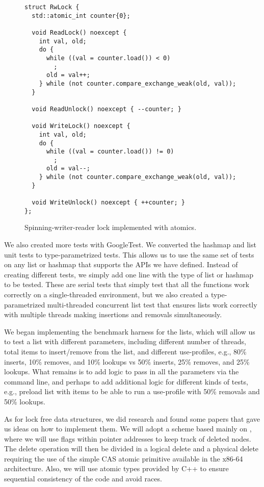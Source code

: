 \documentclass[11pt]{article}
\begin{document}
\begin{figure}
\begin{center}
\begin{lstlisting}
struct RwLock {
  std::atomic_int counter{0};

  void ReadLock() noexcept {
    int val, old;
    do {
      while ((val = counter.load()) < 0)
        ;
      old = val++;
    } while (not counter.compare_exchange_weak(old, val));
  }

  void ReadUnlock() noexcept { --counter; }

  void WriteLock() noexcept {
    int val, old;
    do {
      while ((val = counter.load()) != 0)
        ;
      old = val--;
    } while (not counter.compare_exchange_weak(old, val));
  }

  void WriteUnlock() noexcept { ++counter; }
};
\end{lstlisting}
\caption{Spinning-writer-reader lock implemented with atomics.}
\label{fig:rwlock}
\end{center}
\end{figure}

We also created more tests with GoogleTest. We converted the hashmap and list
unit tests to type-parametrized tests. This allows us to use the same set of
tests on any list or hashmap that supports the APIs we have defined. Instead of
creating different tests, we simply add one line with the type of list or
hashmap to be tested. These are serial tests that simply test that all the
functions work correctly on a single-threaded environment, but we also created a
type-parametrized multi-threaded concurrent list test that ensures lists work
correctly with multiple threads making insertions and removals simultaneously.

We began implementing the benchmark harness for the lists, which will allow us
to test a list with different parameters, including different number of threads,
total items to insert/remove from the list, and different use-profiles, e.g.,
80\% inserts, 10\% removes, and 10\% lookups vs 50\% inserts, 25\% removes, and
25\% lookups. What remains is to add logic to pass in all the parameters via the
command line, and perhaps to add additional logic for different kinds of tests,
e.g., preload list with items to be able to run a use-profile with 50\% removals
and 50\% lookups.

As for lock free data structures, we did research and found some papers that gave
us ideas on how to implement them. We will adopt a scheme based mainly on
\cite{Harris}, where we will use flags within pointer addresses to keep track of
deleted nodes. The delete operation will then be divided in a logical delete and
a physical delete requiring the use of the simple CAS atomic primitive available
in the x86-64 architecture. Also, we will use atomic types provided by C++ to
ensure sequential consistency of the code and avoid races.
\end{document}
